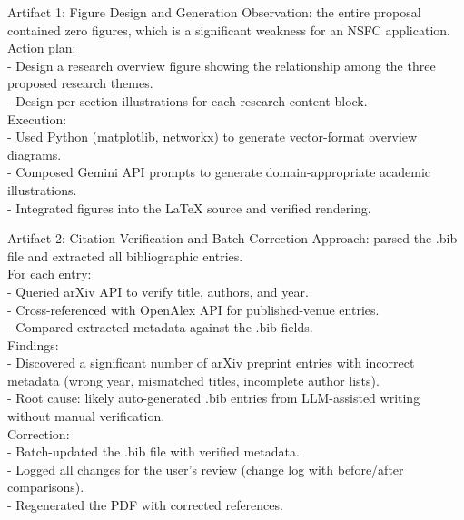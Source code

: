\begin{CaseTraceBox}{Artifact 1: Figure Design and Generation}
\small\ttfamily
Observation: the entire proposal contained zero figures, which is a significant weakness for an NSFC application. \\
Action plan: \\
- Design a research overview figure showing the relationship among the three proposed research themes. \\
- Design per-section illustrations for each research content block. \\[4pt]
Execution: \\
- Used Python (matplotlib, networkx) to generate vector-format overview diagrams. \\
- Composed Gemini API prompts to generate domain-appropriate academic illustrations. \\
- Integrated figures into the LaTeX source and verified rendering.
\end{CaseTraceBox}

\begin{CaseTraceBox}{Artifact 2: Citation Verification and Batch Correction}
\small\ttfamily
Approach: parsed the .bib file and extracted all bibliographic entries. \\
For each entry: \\
- Queried arXiv API to verify title, authors, and year. \\
- Cross-referenced with OpenAlex API for published-venue entries. \\
- Compared extracted metadata against the .bib fields. \\[4pt]
Findings: \\
- Discovered a significant number of arXiv preprint entries with incorrect metadata (wrong year, mismatched titles, incomplete author lists). \\
- Root cause: likely auto-generated .bib entries from LLM-assisted writing without manual verification. \\[4pt]
Correction: \\
- Batch-updated the .bib file with verified metadata. \\
- Logged all changes for the user's review (change log with before/after comparisons). \\
- Regenerated the PDF with corrected references.
\end{CaseTraceBox}

